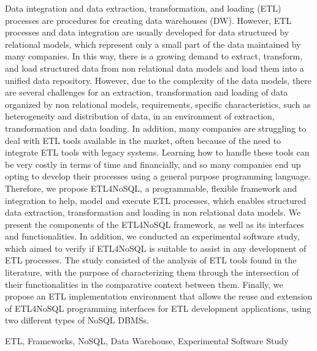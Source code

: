 Data integration and data extraction, transformation, and loading (ETL) processes are procedures for creating data warehouses (DW). However, ETL processes and data integration are usually developed for data structured by relational models, which represent only a small part of the data maintained by many companies. In this way, there is a growing demand to extract, transform, and load structured data from non relational data models and load them into a unified data repository. However, due to the complexity of the data models, there are several challenges for an extraction, transformation and loading of data organized by non relational models, requirements, specific characteristics, such as heterogeneity and distribution of data, in an environment of extraction, transformation and data loading.
In addition, many companies are struggling to deal with ETL tools available in the market, often because of the need to integrate ETL tools with legacy systems. Learning how to handle these tools can be very costly in terms of time and financially, and so many companies end up opting to develop their processes using a general purpose programming language.
Therefore, we propose ETL4NoSQL, a programmable, flexible framework and integration to help, model and execute ETL processes, which enables structured data extraction, transformation and loading in non relational data models. We present the components of the ETL4NoSQL framework, as well as its interfaces and functionalities. In addition, we conducted an experimental software study, which aimed to verify if ETL4NoSQL is suitable to assist in any development of ETL processes. The study consisted of the analysis of ETL tools found in the literature, with the purpose of characterizing them through the intersection of their functionalities in the comparative context between them. Finally, we propose an ETL implementation environment that allows the reuse and extension of ETL4NoSQL programming interfaces for ETL development applications, using two different types of NoSQL DBMSs.

\begin{keywords}
	ETL, Frameworks, NoSQL, Data Warehouse, Experimental Software Study
\end{keywords}
